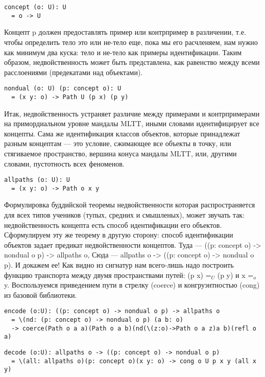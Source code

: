 \begin{lstlisting}
concept (o: U): U
  = o -> U
\end{lstlisting}

Концепт p должен предоставлять пример или контрпример в различении,
т.е. чтобы определить тело это или не-тело еще, пока мы его расчленяем,
нам нужно как минимум два куска: тело и не-тело как примеры идентификации.
Таким образом, недвойственность может быть представлена, как равенство
между всеми расслоениями (предекатами над объектами).

\begin{lstlisting}
nondual (o: U) (p: concept o): U
  = (x y: o) -> Path U (p x) (p y)
\end{lstlisting}

Итак, недвойственность устраняет различие между примерами
и контрпримерами на примордиальном уровне мандалы MLTT,
иными словами идентифицирует все концепты. Сама же идентификация
классов объектов, которые принадлежат разным концептам — это условие,
сжимающее все объекты в точку, или стягиваемое пространство,
вершина конуса мандалы MLTT, или, другими словами,
пустотность всех феноменов.

\begin{lstlisting}
allpaths (o: U): U
  = (x y: o) -> Path o x y
\end{lstlisting}

Формулировка буддийской теоремы недвойственности которая
распространяется для всех типов учеников (тупых, средних и смышленых),
может звучать так: недвойственность концепта есть способ идентификации
его объектов. Сформулируем эту же теорему в другую сторону:
способ идентификации объектов задает предикат недвойственности
концептов. Туда — ((p: concept o) -> nondual o p) -> allpaths o,
Сюда — allpaths o -> ((p: concept o) -> nondual o p).
И докажем ее! Как видно из сигнатур нам всего-лишь надо
построить функцию транспорта между двумя пространствами
путей: (p x) =$_U$ (p y) и x =$_o$ y. Воспользуемся приведением
пути в стрелку (coerce) и конгруэнтностью (cong) из базовой библиотеки.

\begin{lstlisting}
encode (o:U): ((p: concept o) -> nondual o p) -> allpaths o
  = \(nd: (p: concept o) -> nondual o p) (a b: o)
  -> coerce(Path o a a)(Path o a b)(nd(\(z:o)->Path o a z)a b)(refl o a)
\end{lstlisting}

\begin{lstlisting}
decode (o:U): allpaths o -> ((p: concept o) -> nondual o p)
  = \(all: allpaths o)(p: concept o)(x y: o) -> cong o U p x y (all x y)
\end{lstlisting}

